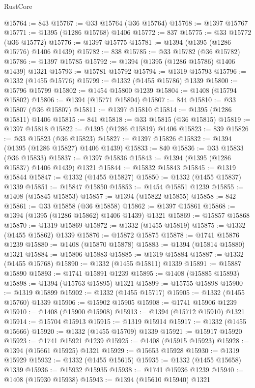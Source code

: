\begin{lexlean}{RustCore}
\begin{coremodule}
@15764 := 843
@15767 := @33 @15764 (@36 @15764)
@15768 := @1397 @15767
@15771 := @1395 (@1286 @15768) @1406
@15772 := 837
@15775 := @33 @15772 (@36 @15772)
@15776 := @1397 @15775
@15781 := @1394 (@1395 (@1286 @15776) @1406 @1439)
@15782 := 838
@15785 := @33 @15782 (@36 @15782)
@15786 := @1397 @15785
@15792 := @1394 (@1395 (@1286 @15786) @1406 @1439) @1321
@15793 := @15781 @15792
@15794 := @1319 @15793
@15796 := @1332 (@1455 @15776)
@15799 := @1332 (@1455 @15786) @1339
@15800 := @15796 @15799
@15802 := @1454 @15800 @1239
@15804 := @1408 (@15794 @15802)
@15806 := @1394 (@15771 @15804)
@15807 := 844
@15810 := @33 @15807 (@36 @15807)
@15811 := @1397 @15810
@15814 := @1395 (@1286 @15811) @1406
@15815 := 841
@15818 := @33 @15815 (@36 @15815)
@15819 := @1397 @15818
@15822 := @1395 (@1286 @15819) @1406
@15823 := 839
@15826 := @33 @15823 (@36 @15823)
@15827 := @1397 @15826
@15832 := @1394 (@1395 (@1286 @15827) @1406 @1439)
@15833 := 840
@15836 := @33 @15833 (@36 @15833)
@15837 := @1397 @15836
@15843 := @1394 (@1395 (@1286 @15837) @1406 @1439) @1321
@15844 := @15832 @15843
@15845 := @1319 @15844
@15847 := @1332 (@1455 @15827)
@15850 := @1332 (@1455 @15837) @1339
@15851 := @15847 @15850
@15853 := @1454 @15851 @1239
@15855 := @1408 (@15845 @15853)
@15857 := @1394 (@15822 @15855)
@15858 := 842
@15861 := @33 @15858 (@36 @15858)
@15862 := @1397 @15861
@15868 := @1394 (@1395 (@1286 @15862) @1406 @1439) @1321
@15869 := @15857 @15868
@15870 := @1319 @15869
@15872 := @1332 (@1455 @15819)
@15875 := @1332 (@1455 @15862) @1339
@15876 := @15872 @15875
@15878 := @1741 @15876 @1239
@15880 := @1408 (@15870 @15878)
@15883 := @1394 (@15814 @15880) @1321
@15884 := @15806 @15883
@15885 := @1319 @15884
@15887 := @1332 (@1455 @15768)
@15890 := @1332 (@1455 @15811) @1339
@15891 := @15887 @15890
@15893 := @1741 @15891 @1239
@15895 := @1408 (@15885 @15893)
@15898 := @1394 (@15763 @15895) @1321
@15899 := @15755 @15898
@15900 := @1319 @15899
@15902 := @1332 (@1455 @15717)
@15905 := @1332 (@1455 @15760) @1339
@15906 := @15902 @15905
@15908 := @1741 @15906 @1239
@15910 := @1408 (@15900 @15908)
@15913 := @1394 (@15712 @15910) @1321
@15914 := @15704 @15913
@15915 := @1319 @15914
@15917 := @1332 (@1455 @15666)
@15920 := @1332 (@1455 @15709) @1339
@15921 := @15917 @15920
@15923 := @1741 @15921 @1239
@15925 := @1408 (@15915 @15923)
@15928 := @1394 (@15661 @15925) @1321
@15929 := @15653 @15928
@15930 := @1319 @15929
@15932 := @1332 (@1455 @15615)
@15935 := @1332 (@1455 @15658) @1339
@15936 := @15932 @15935
@15938 := @1741 @15936 @1239
@15940 := @1408 (@15930 @15938)
@15943 := @1394 (@15610 @15940) @1321

\end{coremodule}
\end{lexlean}
